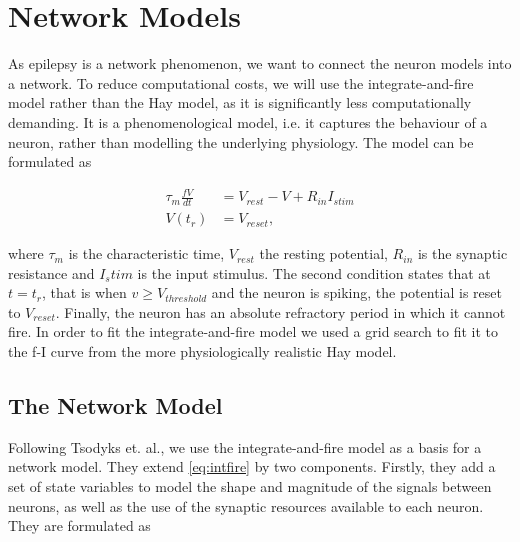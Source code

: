 \section{Network Models}


As epilepsy is a network phenomenon, we want to connect the neuron models into a network. To reduce
computational costs, we will use the integrate-and-fire model rather than the Hay model, as it is
significantly less computationally demanding. It is a phenomenological model, i.e. it captures the
behaviour of a neuron, rather than modelling the underlying physiology. The model can be formulated
as

\begin{align} \label{eq:intfire}
    \tau_m \frac{fV}{dt} &= V_{rest} - V + R_{in}I_{stim} \\
    V(t_r) &= V_{reset},
\end{align}

where \(\tau_m\) is the characteristic time, \(V_{rest}\) the resting potential, \(R_{in}\) is the
synaptic resistance and \(I_stim\) is the input stimulus. The second condition states that at 
\(t = t_r\), that is when \(v \geq V_{threshold}\) and the neuron is spiking, the potential is reset
to \(V_{reset}\). Finally, the neuron has an absolute refractory period in which it cannot fire. In
order to fit the integrate-and-fire model we used a grid search to fit it to the f-I curve
from the more physiologically realistic Hay model.

\subsection{The Network Model}
Following Tsodyks et. al., we use the integrate-and-fire model as a basis for a network model. They
extend \cref{eq:intfire} by two components. Firstly, they add a set of state variables to model the
shape and magnitude of the signals between neurons, as well as the use of the
synaptic resources available to each neuron. %
They are formulated as

